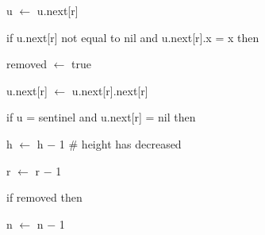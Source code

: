 \documentclass[12pt]{article}
\renewcommand{\_}{\kern-1.5pt\textunderscore\kern-1.5pt}
\begin{document}
\begin{adjustwidth}{1.0in}{0.0in}
u $ \leftarrow $  u.next[r]\par

\end{adjustwidth}

\begin{adjustwidth}{1.0in}{0.0in}
if u.next[r] not equal to nil and u.next[r].x = x then \par

\end{adjustwidth}

\begin{adjustwidth}{1.0in}{0.0in}
removed $ \leftarrow $  true \par

\end{adjustwidth}

\begin{adjustwidth}{1.0in}{0.0in}
u.next[r] $ \leftarrow $  u.next[r].next[r] \par

\end{adjustwidth}

\begin{adjustwidth}{1.0in}{0.0in}
if u = sentinel and u.next[r] = nil then \par

\end{adjustwidth}

\begin{adjustwidth}{1.5in}{0.0in}
h $ \leftarrow $  h $-$  1 $\#$  height has decreased \par

\end{adjustwidth}

\begin{adjustwidth}{0.5in}{0.0in}
r $ \leftarrow $  r $-$  1\par

\end{adjustwidth}

\begin{adjustwidth}{0.5in}{0.0in}
if removed then\par

\end{adjustwidth}

\begin{adjustwidth}{0.5in}{0.0in}
 n $ \leftarrow $  n $-$  1 \par

\end{adjustwidth}
\end{document}
